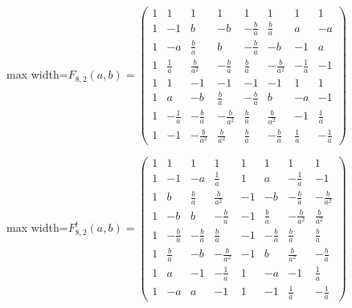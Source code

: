 \documentclass[11pt,a4paper]{article}
\theoremstyle{plain}
\theoremstyle{definition}
\numberwithin{equation}{section}
\begin{document}
\begin{center}\normalsize\setlength{\arraycolsep}{3.8pt}
\begin{adjustbox}{max width=\textwidth}$\displaystyle F_{8,2}(a,b)=\begin{pmatrix}
1 & 1 & 1 & 1 & 1 & 1 & 1 & 1 \\
1 & -1 & b & -b & -\frac{b}{a} & \frac{b}{a} & a & -a \\
1 & -a & \frac{b}{a} & b & -\frac{b}{a} & -b & -1 & a \\
1 & \frac{1}{a} & \frac{b}{a^{2}} & -\frac{b}{a} & \frac{b}{a} & -\frac{b}{a^{2}} & -\frac{1}{a} & -1 \\
1 & 1 & -1 & -1 & -1 & -1 & 1 & 1 \\
1 & a & -b & \frac{b}{a} & -\frac{b}{a} & b & -a & -1 \\
1 & -\frac{1}{a} & -\frac{b}{a} & -\frac{b}{a^{2}} & \frac{b}{a} & \frac{b}{a^{2}} & -1 & \frac{1}{a} \\
1 & -1 & -\frac{b}{a^{2}} & \frac{b}{a^{2}} & \frac{b}{a} & -\frac{b}{a} & \frac{1}{a} & -\frac{1}{a}
\end{pmatrix}$\end{adjustbox}
\end{center}

\begin{center}\normalsize\setlength{\arraycolsep}{3.8pt}
\begin{adjustbox}{max width=\textwidth}$\displaystyle F_{8,2}^{t}(a,b)=\begin{pmatrix}
1 & 1 & 1 & 1 & 1 & 1 & 1 & 1 \\
1 & -1 & -a & \frac{1}{a} & 1 & a & -\frac{1}{a} & -1 \\
1 & b & \frac{b}{a} & \frac{b}{a^{2}} & -1 & -b & -\frac{b}{a} & -\frac{b}{a^{2}} \\
1 & -b & b & -\frac{b}{a} & -1 & \frac{b}{a} & -\frac{b}{a^{2}} & \frac{b}{a^{2}} \\
1 & -\frac{b}{a} & -\frac{b}{a} & \frac{b}{a} & -1 & -\frac{b}{a} & \frac{b}{a} & \frac{b}{a} \\
1 & \frac{b}{a} & -b & -\frac{b}{a^{2}} & -1 & b & \frac{b}{a^{2}} & -\frac{b}{a} \\
1 & a & -1 & -\frac{1}{a} & 1 & -a & -1 & \frac{1}{a} \\
1 & -a & a & -1 & 1 & -1 & \frac{1}{a} & -\frac{1}{a}
\end{pmatrix}$\end{adjustbox}
\end{center}
\end{document}
